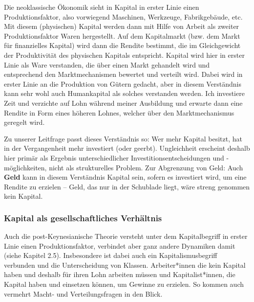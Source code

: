 \documentclass[
  nswissgerman,
  a4paper,
  DIV=11,
  numbers=noendperiod,
  oneside,
  openany]{scrreprt}
\begin{document}
Die neoklassische Ökonomik sieht in Kapital in erster Linie einen
Produktionsfaktor, also vorwiegend Maschinen, Werkzeuge, Fabrikgebäude,
etc. Mit diesem (physischen) Kapital werden dann mit Hilfe von Arbeit
als zweiter Produktionsfaktor Waren hergestellt. Auf dem Kapitalmarkt
(bzw. dem Markt für finanzielles Kapital) wird dann die Rendite
bestimmt, die im Gleichgewicht der Produktivität des physischen Kapitals
entspricht. Kapital wird hier in erster Linie als Ware verstanden, die
über einen Markt gehandelt wird und entsprechend den Marktmechanismen
bewertet und verteilt wird. Dabei wird in erster Linie an die Produktion
von Gütern gedacht, aber in diesem Verständnis kann sehr wohl auch
Humankapital als solches verstanden werden. Ich investiere Zeit und
verzichte auf Lohn während meiner Ausbildung und erwarte dann eine
Rendite in Form eines höheren Lohnes, welcher über den Marktmechanismus
geregelt wird.

Zu unserer Leitfrage passt dieses Verständnis so: Wer mehr Kapital
besitzt, hat in der Vergangenheit mehr investiert (oder geerbt).
Ungleichheit erscheint deshalb hier primär als Ergebnis
unterschiedlicher Investitionsentscheidungen und -möglichkeiten, nicht
als strukturelles Problem. Zur Abgrenzung von Geld: Auch \textbf{Geld}
kann in diesem Verständnis Kapital sein, sofern es investiert wird, um
eine Rendite zu erzielen -- Geld, das nur in der Schublade liegt, wäre
streng genommen kein Kapital.

\subsubsection{Kapital als gesellschaftliches
Verhältnis}\label{kapital-als-gesellschaftliches-verhuxe4ltnis}

Auch die post-Keynesianische Theorie versteht unter dem Kapitalbegriff
in erster Linie einen Produktionsfaktor, verbindet aber ganz andere
Dynamiken damit (siehe Kapitel 2.5). Insbesondere ist dabei auch ein
Kapitalismusbegriff verbunden und die Unterscheidung von Klassen.
Arbeiter*innen die kein Kapital haben und deshalb für ihren Lohn
arbeiten müssen und Kapitalist*innen, die Kapital haben und einsetzen
können, um Gewinne zu erzielen. So kommen auch vermehrt Macht- und
Verteilungsfragen in den Blick.
\end{document}
